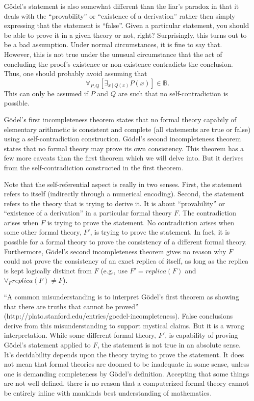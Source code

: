 \documentclass[12pt]{article}
\begin{document}
G\"odel's statement is also somewhat different than the liar's paradox in that it deals with the ``provability'' or ``existence of a derivation'' rather then simply expressing that the statement is ``false''.  Given a particular statement, you should be able to prove it in a given theory or not, right?  Surprisingly, this turns out to be a bad assumption.  Under normal circumstances, it is fine to say that.  However, this is not true under the unusual circumstance that the act of concluding the proof's existence or non-existence contradicts the conclusion.  Thus, one should probably avoid assuming that
\begin{equation}
\forall_{P, Q} \left[ \exists_{x~|~Q(x)} P(x) \right] \in \mathbb{B}.  
\end{equation}
This can only be assumed if $P$ and $Q$ are such that no self-contradiction is possible.

G\"odel's first incompleteness theorem states that no formal theory capabily of elementary arithmetic is consistent and complete (all statements are true or false) using a self-contradiction construction.  G\"odel's second incompleteness theorem states that no formal theory may prove its own consistency.  This theorem has a few more caveats than the first theorem which we will delve into.  But it derives from the self-contradiction constructed in the first theorem.

Note that the self-referential aspect is really in two senses.  First, the statement refers to itself (indirectly through a numerical encoding).  Second, the statement refers to the theory that is trying to derive it.  It is about ``provability'' or ``existence of a derivation'' in a particular formal theory $F$.  The contradiction arises when $F$ is trying to prove the statement.  No contradiction arises when some other formal theory, $F'$, is trying to prove the statement.  In fact, it is possible for a formal theory to prove the consistency of a different formal theory.  Furthermore, G\"odel's second incompleteness theorem gives no reason why $F$ could not prove the consistency of an exact replica of itself, as long as the replica is kept logically distinct from $F$ (e.g., use $F' = replica(F)$ and $\forall_{F} replica(F) \neq F$).

``A common misunderstanding is to interpret G\"odel's first theorem as showing that there are truths that cannot be proved'' (http://plato.stanford.edu/entries/goedel-incompleteness).  False conclusions derive from this misunderstanding to support mystical claims.  But it is a wrong interpretation.  While some different formal theory, $F'$, is capability of proving G\"odel's statement applied to $F$, the statement is not true in an absolute sense.  It's decidability depends upon the theory trying to prove the statement.  It does not mean that formal theories are doomed to be inadequate in some sense, unless one is demanding completeness by G\"odel's definition.  Accepting that some things are not well defined, there is no reason that a computerized formal theory cannot be entirely inline with mankinds best understanding of mathematics.
\end{document}
